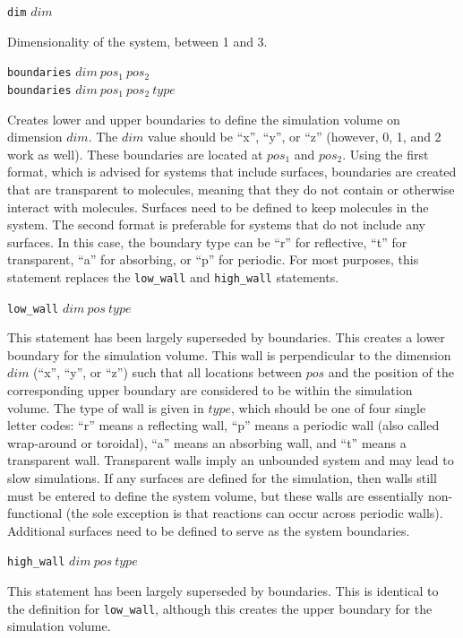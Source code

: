 \documentclass {scrbook}
\newcommand {\ttt} {\texttt}
\begin{document}
\begin{description}

\item{\ttt{dim} $dim$}

Dimensionality of the system, between 1 and 3.

\item{\ttt{boundaries} $dim\ pos_1\ pos_2$\\
\ttt{boundaries} $dim\ pos_1\ pos_2\ type$}

Creates lower and upper boundaries to define the simulation volume on dimension $dim$. The $dim$ value should be ``x'', ``y'', or ``z'' (however, 0, 1, and 2 work as well). These boundaries are located at $pos_1$ and $pos_2$. Using the first format, which is advised for systems that include surfaces, boundaries are created that are transparent to molecules, meaning that they do not contain or otherwise interact with molecules. Surfaces need to be defined to keep molecules in the system. The second format is preferable for systems that do not include any surfaces. In this case, the boundary type can be ``r'' for reflective, ``t'' for transparent, ``a'' for absorbing, or ``p'' for periodic. For most purposes, this statement replaces the \ttt{low\_wall} and \ttt{high\_wall} statements.

\item{\ttt{low\_wall} $dim\ pos\ type$}

This statement has been largely superseded by boundaries. This creates a lower boundary for the simulation volume. This wall is perpendicular to the dimension $dim$ (``x'', ``y'', or ``z'') such that all locations between $pos$ and the position of the corresponding upper boundary are considered to be within the simulation volume. The type of wall is given in $type$, which should be one of four single letter codes: ``r'' means a reflecting wall, ``p'' means a periodic wall (also called wrap-around or toroidal), ``a'' means an absorbing wall, and ``t'' means a transparent wall. Transparent walls imply an unbounded system and may lead to slow simulations. If any surfaces are defined for the simulation, then walls still must be entered to define the system volume, but these walls are essentially non-functional (the sole exception is that reactions can occur across periodic walls). Additional surfaces need to be defined to serve as the system boundaries.

\item{\ttt{high\_wall} $dim\ pos\ type$}

This statement has been largely superseded by boundaries. This is identical to the definition for \ttt{low\_wall}, although this creates the upper boundary for the simulation volume.


\end{description}
\end{document}
